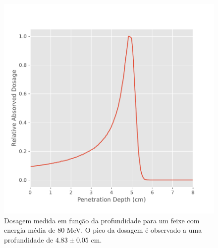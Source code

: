 \documentclass[a4paper, 12pt]{article} %
\begin{document}
\begin{figure}[H]
\begin{minipage}[r]{.49\linewidth}
			\includegraphics[width=\linewidth]{bragg_peak_80mev.pdf}
			\caption{Dosagem medida em função da profundidade para um feixe com energia média de 80 MeV. O pico da dosagem é observado a uma profundidade de $4.83 \pm 0.05$ cm.}
			\label{fig:bragg_peak80}
		\end{minipage}
	\end{figure}
\end{document}
